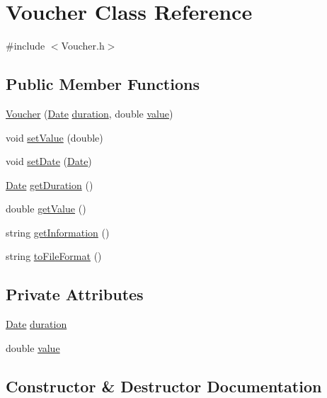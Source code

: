 \hypertarget{classVoucher}{}\section{Voucher Class Reference}
\label{classVoucher}


{\ttfamily \#include $<$Voucher.\+h$>$}

\subsection*{Public Member Functions}
\begin{DoxyCompactItemize}
\item 
\hyperlink{classVoucher_aec53b33fa78469b74a2a098d709d2628}{Voucher} (\hyperlink{classDate}{Date} \hyperlink{classVoucher_a68434d1be856aa11041f21bf9036b733}{duration}, double \hyperlink{classVoucher_a1a0c90ed8a1aac5c6a92cb1912a16572}{value})
\item 
void \hyperlink{classVoucher_a75ecfe9594cdbc6bcf6c38326672d040}{set\+Value} (double)
\item 
void \hyperlink{classVoucher_a1db87fd0a6b0ec16825c52a6f24fa4b1}{set\+Date} (\hyperlink{classDate}{Date})
\item 
\hyperlink{classDate}{Date} \hyperlink{classVoucher_a661d91c985c89f3cb9231db52c45a8f1}{get\+Duration} ()
\item 
double \hyperlink{classVoucher_a1fa7c64bf3bada3b425a05fd43311519}{get\+Value} ()
\item 
string \hyperlink{classVoucher_a3fbbf6a661b7542fa1012bb287d564d8}{get\+Information} ()
\item 
string \hyperlink{classVoucher_abac34093e355c27735b6e7bc04bae7bb}{to\+File\+Format} ()
\end{DoxyCompactItemize}
\subsection*{Private Attributes}
\begin{DoxyCompactItemize}
\item 
\hyperlink{classDate}{Date} \hyperlink{classVoucher_a68434d1be856aa11041f21bf9036b733}{duration}
\item 
double \hyperlink{classVoucher_a1a0c90ed8a1aac5c6a92cb1912a16572}{value}
\end{DoxyCompactItemize}


\subsection{Constructor \& Destructor Documentation}
\hypertarget{classVoucher_aec53b33fa78469b74a2a098d709d2628}{}\label{classVoucher_aec53b33fa78469b74a2a098d709d2628} 
